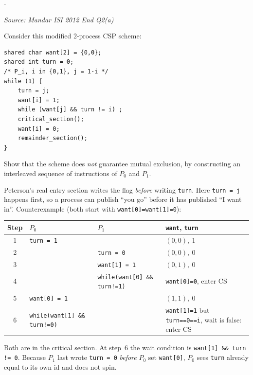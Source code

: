 \documentclass[11pt,a4paper]{article}
\makeatletter
\newcommand{\keepspace}[1]{\par\penalty-100\begingroup
  \setlength{\dimen@}{#1}\dimen@ii\pagegoal\advance\dimen@ii-\pagetotal
  \ifdim\dimen@>\dimen@ii\ifdim\dimen@ii>\z@\vfil\fi\break\fi\endgroup}
\newcounter{qn}[section]
\newenvironment{Qn}[4]{%
  \refstepcounter{qn}\keepspace{7\baselineskip}%
  \begin{tcolorbox}[qboxstyle, title={Q\thesection.\theqn\ \ [#1 \textbar\ #2]\ \ #4}]%
  {\footnotesize\color{g3}\textit{Source: #3}}\par\smallskip%
}{%
  \end{tcolorbox}%
}
\newenvironment{Sol}{%
  \begin{tcolorbox}[sboxstyle, title={Solution}]%
}{%
  \end{tcolorbox}\vspace{0.35em}%
}
\makeatother
\begin{document}
\begin{Qn}{Hard}{Lect 17}{Mandar ISI 2012 End Q2(a)}{Modified Peterson: exhibit a mutual-exclusion failure}
Consider this modified 2-process CSP scheme:

\begin{lstlisting}[numbers=none]
shared char want[2] = {0,0};
shared int turn = 0;
/* P_i, i in {0,1}, j = 1-i */
while (1) {
    turn = j;
    want[i] = 1;
    while (want[j] && turn != i) ;
    critical_section();
    want[i] = 0;
    remainder_section();
}
\end{lstlisting}

Show that the scheme does \emph{not} guarantee mutual exclusion, by constructing an interleaved sequence of instructions of $P_0$ and $P_1$.
\end{Qn}
\begin{Sol}
Peterson's real entry section writes the flag \emph{before} writing \texttt{turn}. Here \texttt{turn = j} happens first, so a process can publish ``you go'' before it has published ``I want in''. Counterexample (both start with \texttt{want[0]=want[1]=0}):

\begin{center}
\small
\begin{tabularx}{\linewidth}{@{}c|l|l|X@{}}
Step & $P_0$ & $P_1$ & \texttt{want}, \texttt{turn} \\
\hline
1 & \texttt{turn = 1} & & $(0,0),\ 1$ \\
2 & & \texttt{turn = 0} & $(0,0),\ 0$ \\
3 & & \texttt{want[1] = 1} & $(0,1),\ 0$ \\
4 & & \texttt{while(want[0] \&\& turn!=1)} & \texttt{want[0]=0}, enter CS \\
5 & \texttt{want[0] = 1} & & $(1,1),\ 0$ \\
6 & \texttt{while(want[1] \&\& turn!=0)} & &
    \texttt{want[1]=1} but \texttt{turn==0==i}, wait is false: enter CS \\
\end{tabularx}
\end{center}

Both are in the critical section. At step~6 the wait condition is \texttt{want[1] \&\& turn != 0}. Because $P_1$ last wrote \texttt{turn = 0} \emph{before} $P_0$ set \texttt{want[0]}, $P_0$ sees \texttt{turn} already equal to its own id and does not spin.
\end{Sol}
\end{document}
